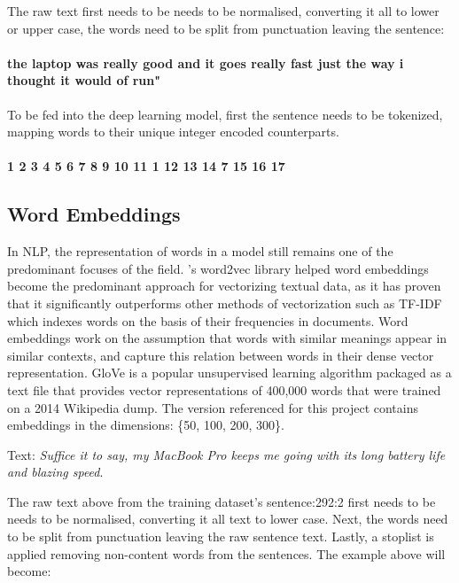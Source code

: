 The raw text first needs to be needs to be normalised, converting it all to lower or upper case, the words need to be split from punctuation leaving the sentence: 

\paragraph{the laptop was really good and it goes really fast just the way i thought it would of run"}

To be fed into the deep learning model, first the sentence needs to be tokenized, mapping words to their unique integer encoded counterparts. 
\paragraph{1 2 3 4 5 6 7 8 9 10 11 1 12 13 14 7 15 16 17}

\citep{te}





\subsection{Word Embeddings}
In NLP, the representation of words in a model still remains one of the predominant focuses of the field. \textcolor{cite}{\cite{mikolov}}'s word2vec library helped word embeddings become the predominant approach for vectorizing textual data, as it has proven that it significantly outperforms other methods of vectorization such as TF-IDF which indexes words on the basis of their frequencies in documents. Word embeddings work on the assumption that words with similar meanings appear in similar contexts, and capture this relation between words in their dense vector representation.
\newline
GloVe \textcolor{cite}{\cite{glove}} is a popular unsupervised learning algorithm packaged as a text file that provides vector representations of 400,000 words that were trained on a 2014 Wikipedia dump. The version referenced for this project contains embeddings in the dimensions: \{50, 100, 200, 300\}. \\
\begin{center}
    Text: \textit{Suffice it to say, my MacBook Pro keeps me going with its long battery life and blazing speed}.\\
\end{center}
The raw text above from the training dataset's sentence:292:2 first needs to be needs to be normalised, converting it all text to lower case. Next, the words need to be split from punctuation leaving the raw sentence text. Lastly, a stoplist is applied removing non-content words from the sentences. The example above will become:  

